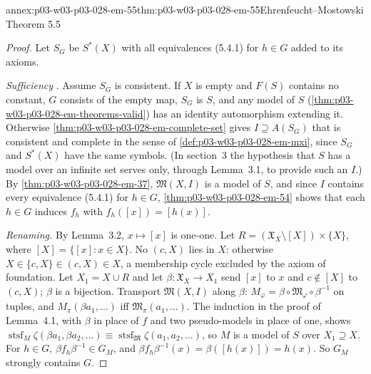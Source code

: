 \begin{annexitem}{annex:p03-w03-p03-028-em-55}{thm:p03-w03-p03-028-em-55}{Ehrenfeucht--Mostowski Theorem 5.5}
\begin{proof}
Let \(S_G\) be \(S^*(X)\) with all equivalences
(5.4.1) for \(h\in G\) added to its axioms.

\emph{Sufficiency} \cite[p.~60]{EhrenfeuchtMostowski1956}.  Assume \(S_G\) is
consistent.  If \(X\) is empty and \(F(S)\) contains no constant, \(G\)
consists of the empty map, \(S_G\) is \(S\), and any model of \(S\)
(\cref{thm:p03-w03-p03-028-em-theorems-valid}) has an identity automorphism
extending it.  Otherwise \cref{thm:p03-w03-p03-028-em-complete-set} gives
\(I\supseteq A(S_G)\) that is consistent and complete in the sense of
\cref{def:p03-w03-p03-028-em-mxi}, since \(S_G\) and \(S^*(X)\) have the same
symbols.  (In section~3 the hypothesis that \(S\) has a model over an infinite
set serves only, through Lemma~3.1, to provide such an \(I\).)  By
\cref{thm:p03-w03-p03-028-em-37}, \(\mathfrak M(X,I)\) is a model of \(S\), and
since \(I\) contains every equivalence (5.4.1) for
\(h\in G\), \cref{thm:p03-w03-p03-028-em-54} shows that each \(h\in G\) induces
\(f_h\) with \(f_h([x])=[h(x)]\).

\emph{Renaming.}  By Lemma~3.2, \(x\mapsto[x]\) is one-one.  Let
\(R=(\mathfrak X_X\setminus[X])\times\{X\}\), where \([X]=\{[x]:x\in X\}\).
No \((c,X)\) lies in \(X\): otherwise \(X\in\{c,X\}\in(c,X)\in X\), a membership
cycle excluded by the axiom of foundation.  Let \(X_1=X\cup R\) and let
\(\beta\colon\mathfrak X_X\to X_1\) send \([x]\) to \(x\) and \(c\notin[X]\) to
\((c,X)\); \(\beta\) is a bijection.  Transport \(\mathfrak M(X,I)\) along
\(\beta\): \(M_\varphi=\beta\circ\mathfrak M_\varphi\circ\beta^{-1}\) on tuples,
and \(M_\pi(\beta a_1,\ldots)\) iff \(\mathfrak M_\pi(a_1,\ldots)\).  The
induction in the proof of Lemma~4.1, with \(\beta\) in place of \(f\) and two
pseudo-models in place of one, shows
\(\operatorname{stsf}_M\zeta(\beta a_1,\beta a_2,\ldots)\equiv
\operatorname{stsf}_{\mathfrak M}\zeta(a_1,a_2,\ldots)\), so \(M\) is a model of
\(S\) over \(X_1\supseteq X\).  For \(h\in G\),
\(\beta f_h\beta^{-1}\in G_M\), and \(\beta f_h\beta^{-1}(x)=\beta([h(x)])=h(x)\).
So \(G_M\) strongly contains \(G\).


\end{proof}
\end{annexitem}

